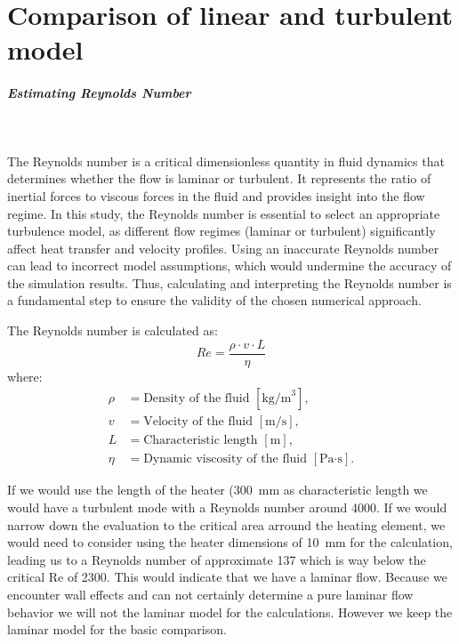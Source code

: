 \chapter{Comparison of linear and turbulent model}
\label{chapter:solver_comp}

\paragraph{Estimating Reynolds Number}~

The Reynolds number is a critical dimensionless quantity in fluid dynamics that determines whether the flow is laminar or turbulent. It represents the ratio of inertial forces to viscous forces in the fluid and provides insight into the flow regime. In this study, the Reynolds number is essential to select an appropriate turbulence model, as different flow regimes (laminar or turbulent) significantly affect heat transfer and velocity profiles. Using an inaccurate Reynolds number can lead to incorrect model assumptions, which would undermine the accuracy of the simulation results. Thus, calculating and interpreting the Reynolds number is a fundamental step to ensure the validity of the chosen numerical approach.

The Reynolds number is calculated as:
\[
Re = \frac{\rho \cdot v \cdot L}{\eta}
\]
where:
\begin{align*}
\rho & = \text{Density of the fluid } [\text{kg/m}^3], \\
v & = \text{Velocity of the fluid } [\text{m/s}], \\
L & = \text{Characteristic length } [\text{m}], \\
\eta & = \text{Dynamic viscosity of the fluid } [\text{Pa·s}].
\end{align*}

If we would use the length of the heater (\SI{300}{\mm} as characteristic length we would have a turbulent mode with a Reynolds number around \SI{4000}{}. If we would narrow down the evaluation to the critical area arround the heating element, we would need to consider using the heater dimensions of \SI{10}{\mm} for the calculation, leading us to a Reynolds number of approximate \SI{137}{} which is way below the critical Re of \SI{2300}{}. This would indicate that we have a laminar flow.
Because we encounter wall effects and can not certainly determine a pure laminar flow behavior we will not the laminar model for the calculations. However we keep the laminar model for the basic comparison.


